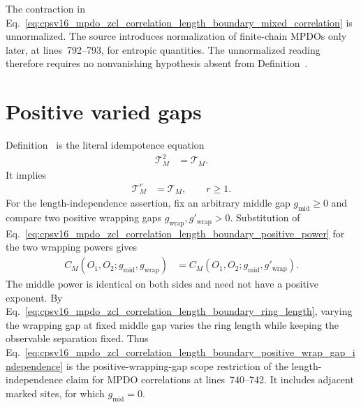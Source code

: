 \documentclass{article}
\begin{document}
The contraction in
Eq.~\ref{eq:cpsv16_mpdo_zcl_correlation_length_boundary_mixed_correlation}
is unnormalized. The source introduces normalization of finite-chain MPDOs
only later, at lines~792--793, for entropic quantities. The unnormalized
reading therefore requires no nonvanishing hypothesis absent from
Definition~.

\section{Positive varied gaps}

Definition~ is the literal idempotence equation
\begin{align}
    \mathcal T_M^2
        &=\mathcal T_M.
    \label{eq:cpsv16_mpdo_zcl_correlation_length_boundary_idempotence}
\end{align}
It implies
\begin{align}
    \mathcal T_M^r
        &=\mathcal T_M,
        \qquad r\geq 1.
    \label{eq:cpsv16_mpdo_zcl_correlation_length_boundary_positive_power}
\end{align}
For the length-independence assertion, fix an arbitrary middle gap
$g_{\mathrm{mid}}\geq0$ and compare two positive wrapping gaps
$g_{\mathrm{wrap}},g'_{\mathrm{wrap}}>0$. Substitution of
Eq.~\ref{eq:cpsv16_mpdo_zcl_correlation_length_boundary_positive_power} for
the two wrapping powers gives
\begin{align}
    C_M(O_1,O_2;g_{\mathrm{mid}},g_{\mathrm{wrap}})
        &=C_M(O_1,O_2;g_{\mathrm{mid}},g'_{\mathrm{wrap}}).
    \label{eq:cpsv16_mpdo_zcl_correlation_length_boundary_positive_wrap_gap_independence}
\end{align}
The middle power is identical on both sides and need not have a positive
exponent. By
Eq.~\ref{eq:cpsv16_mpdo_zcl_correlation_length_boundary_ring_length}, varying
the wrapping gap at fixed middle gap varies the ring length while keeping the
observable separation fixed. Thus
Eq.~\ref{eq:cpsv16_mpdo_zcl_correlation_length_boundary_positive_wrap_gap_independence}
is the positive-wrapping-gap scope restriction of the length-independence
claim for MPDO correlations at lines~740--742. It includes adjacent marked
sites, for which $g_{\mathrm{mid}}=0$.
\end{document}
